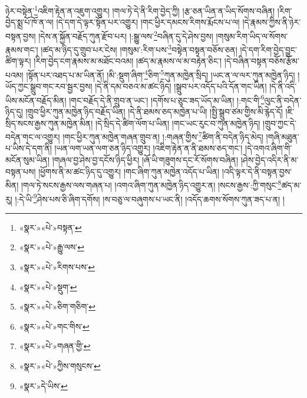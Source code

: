 ཉེར་བསྟེན་\footnote{«སྣར་»«པེ་»བསྟན་}འཇིག་རྟེན་ན་འཇུག་འགྱུར། །གལ་ཏེ་དེ་ནི་རིག་བྱེད་ཀྱི། །རྩ་ཅན་ཡིན་ན་ཡིད་སོགས་བཞིན། །རིག་བྱེད་སྨྲ་པོ་ཁོ་ན་ལ། །དེ་དག་དེ་ལྟར་སྟོན་པར་འགྱུར། །གང་ཕྱིར་དམངས་རིགས་རྨོངས་པ་ལ། །དེ་རྣམས་ཀྱིས་ནི་ཉེར་བསྟན་བྱས། །དེས་ན་སྐྱོན་བརྗོད་ཀུན་རྫོབ་པར། །:སྒྱུ་ལས་\footnote{«སྣར་»«པེ་»རྒྱུ་ལས་}བཞིན་དུ་དེ་ཤེས་བྱས། །གསུམ་རིག་ཡིད་ལ་སོགས་རྣམས་གང་། །ཚད་མ་ཉིད་དུ་གྲུབ་པར་ངེས། །གསུམ་:རིག་པས་\footnote{«སྣར་»«པེ་»རིགས་པས་}བསྟེན་བསྟན་བཅོས་ཅན། །དེ་དག་རིག་བྱེད་བྱུང་ཚིག་ལྟར། །རིག་བྱེད་ངག་རྣམས་མ་མཐོང་བའམ། །ཚད་མ་རྣམས་ལ་མ་བརྟེན་ཅིང་། །དེ་བཞིན་བསྟན་བཅོས་རྩོམ་པའམ། །སྟོན་པར་འཐད་པ་མ་ཡིན་ནོ། །མི་:སྡུག་ཞིག་\footnote{«སྣར་»«པེ་»སྡུག་}ཅིག་\footnote{«སྣར་»«པེ་»ཅིག་གཅིག་}ཀུན་མཁྱེན་སྲིད། །ཡང་ན་ལ་ལར་ཀུན་མཁྱེན་ཉིད། །ཡོད་ཀྱང་སྒྲུབ་གང་རབ་སྦྱར་བྱས། །དེ་ནི་དམ་བཅའ་མ་ཚང་ཉིད། །སྒྲུབ་པར་འདོད་པའི་དོན་གང་ཡིན། །དེ་ནི་འདི་ཡིས་མངོན་བརྗོད་མིན། །གང་བརྗོད་དེ་ནི་གྲུབ་ན་ཡང་། །དགོས་པ་ཅུང་ཟད་ཡོད་མ་ཡིན། །:གང་གི་\footnote{«སྣར་»«པེ་»གང་གིས་}ལུང་ནི་བདེན་ཉིད་དུ། །གྲུབ་ཕྱིར་ཀུན་མཁྱེན་ཉིད་བརྗོད་ཡིན། །དེ་ནི་ཐམས་ཅད་མཁྱེན་པ་ཡི། །སྤྱི་སྒྲུབ་ཙམ་གྱིས་མི་རྙེད་དོ། །ཇི་སྲིད་སངས་རྒྱས་ཀུན་མཁྱེན་མིན། །དེ་སྲིད་དེ་ཚིག་ལོག་པ་ཡིན། །གང་ཡང་རུང་བ་ཀུན་མཁྱེན་ཉིད། །གྲུབ་ཀྱང་དེ་བདེན་གང་ལ་འགྱུར། །གང་ཕྱིར་ཀུན་མཁྱེན་གཞན་གྲུབ་ན། །:གཞན་གྱིས་\footnote{«སྣར་»«པེ་»གཞན་གྱི་}ཚིག་ནི་བདེན་ཉིད་མེད། །གཞི་མཐུན་པ་ཡིས་དེ་དག་ནི། །ཡན་ལག་ཡན་ལག་ཅན་ཉིད་འགྱུར། །འཇིག་རྟེན་ན་ནི་ཐམས་ཅད་གང་། །དེ་འགའ་ཞིག་གི་མངོན་སུམ་ཡིན། །གཞལ་བྱ་ཤེས་བྱ་དངོས་ཉིད་ཕྱིར། །ཞོ་ཡི་གཟུགས་དང་རོ་སོགས་བཞིན། །ཤེས་བྱེད་འདིར་ནི་མ་བསྟན་པས། །ཕྱོགས་ནི་མ་ཚང་ཉིད་དུ་འགྱུར། །གང་ཞིག་ཀུན་མཁྱེན་འདོད་པ་ཡིན། །འདི་ལྟར་དེ་ནི་བསྟན་བྱས་མིན། །གལ་ཏེ་སངས་རྒྱས་ལས་གཞན་པ། །འགའ་ཞིག་ཀུན་མཁྱེན་ཉིད་འགྱུར་ན། །སངས་རྒྱས་:ཀྱི་གསུང་\footnote{«སྣར་»«པེ་»ཀྱིས་གསུངས་}ཚད་མ་རུ། །:དེ་ཡི་\footnote{«སྣར་»དེ་ཡིས་}ཤེས་པས་ཅི་ཞིག་དགོས། །ས་བཅུ་ལ་བཞུགས་པ་ཡང་ནི། །འདོད་ཆགས་སོགས་ཀུན་ཟད་པ་ན། །
